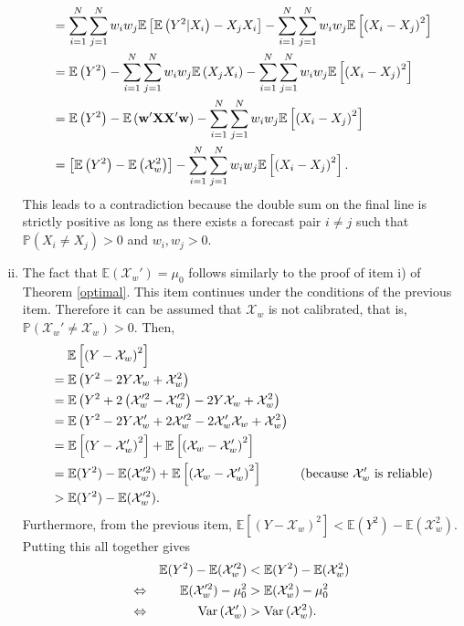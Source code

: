 \documentclass[11pt]{article}
\renewcommand{\P}{\mathbb{P}}
\newcommand{\E}{\mathbb{E}}
\theoremstyle{definition}
\theoremstyle{definition}
\def\w{{\bf w}}
\def\X{{\bf X}}
\def\P{{\mathbb P}}
\def\E{{\mathbb E}}
\def\Var{{\rm Var}\,}
\begin{document}
\begin{enumerate}[i)]
\begin{align*}
&= \sum_{i=1}^N\sum_{j=1}^Nw_iw_j \E\left[\E\left(Y^2|X_i\right) -X_jX_i\right]-\sum_{i=1}^N\sum_{j=1}^Nw_iw_j\E\left[\left(X_i-X_j\right)^2\right] \\
&=  \E\left(Y^2\right) - \sum_{i=1}^N\sum_{j=1}^Nw_iw_j \E\left(X_jX_i\right)-\sum_{i=1}^N\sum_{j=1}^Nw_iw_j\E\left[\left(X_i-X_j\right)^2\right] \\
&=  \E\left(Y^2\right) -  \E\left(\w'\X \X'\w\right)-\sum_{i=1}^N\sum_{j=1}^Nw_iw_j\E\left[\left(X_i-X_j\right)^2\right] \\
&= \left[\E\left(Y^2\right) -  \E\left(\mathcal{X}_w^2\right) \right]-\sum_{i=1}^N\sum_{j=1}^Nw_iw_j\E\left[\left(X_i-X_j\right)^2\right].
\end{align*}
This leads to a contradiction because the double sum on the final line is strictly positive as long as there exists a forecast pair $i \neq j$ such that $\P(X_i \neq X_j) > 0$ and $w_i, w_j > 0$. 

\item The fact that $\E(\mathcal{X}_w') = \mu_0$ follows similarly to the proof of item i) of Theorem \ref{optimal}. This item continues under the conditions of the previous item. Therefore it can be assumed that $\mathcal{X}_w$ is not calibrated, that is, $\P(\mathcal{X}_w' \neq \mathcal{X}_w) > 0$. Then,
\begin{align*}
&\hspace{1.3em}   \E \left[ \left( Y - \mathcal{X}_w\right)^2\right]\\
 &= \E \left( Y^2 - 2Y\mathcal{X}_w + \mathcal{X}_w^2\right)\\
&= \E \left( Y^2 + 2\left(\mathcal{X}_w'^2-\mathcal{X}_w'^2\right)- 2Y\mathcal{X}_w + \mathcal{X}_w^2\right)\\
&= \E \left( Y^2 -2Y\mathcal{X}_w'+2\mathcal{X}_w'^2- 2\mathcal{X}_w'\mathcal{X}_w + \mathcal{X}_w^2\right)\\
&= \E\left[\left(Y-\mathcal{X}_w'\right)^2\right] + \E\left[\left(\mathcal{X}_w-\mathcal{X}_w'\right)^2\right] \\
&= \E(Y^2)-\E(\mathcal{X}_w'^2) + \E\left[\left(\mathcal{X}_w-\mathcal{X}_w'\right)^2\right] & \text{(because $\mathcal{X}_w'$ is reliable)}\\
&> \E(Y^2)-\E(\mathcal{X}_w'^2).
\end{align*}
Furthermore, from the previous item, $\E \left[ \left( Y - \mathcal{X}_w\right)^2\right] < \E(Y^2)-\E(\mathcal{X}_w^2)$. Putting this all together gives
\begin{align*}
&&\E(Y^2)-\E(\mathcal{X}_w'^2)  &< \E(Y^2)-\E(\mathcal{X}_w^2)\\
\Leftrightarrow && \E(\mathcal{X}_w'^2) - \mu_0^2  &> \E(\mathcal{X}_w^2) - \mu_0^2\\
\Leftrightarrow && \Var(\mathcal{X}_w')  &> \Var(\mathcal{X}_w^2).
\end{align*}



\end{enumerate}
\end{document}
